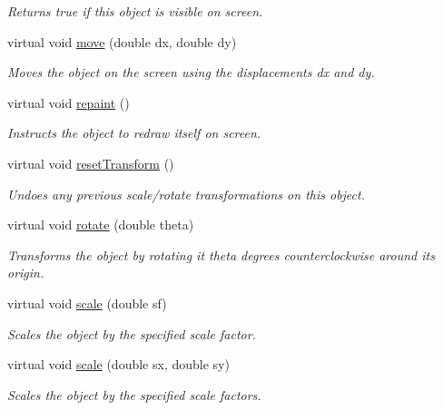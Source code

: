\begin{DoxyCompactItemize}
\begin{DoxyCompactList}\small\item\em Returns {\ttfamily true} if this object is visible on screen. \end{DoxyCompactList}\item 
virtual void \mbox{\hyperlink{classsgl_1_1GObject_a5973d8dda83afb36e2c56855515be392}{move}} (double dx, double dy)
\begin{DoxyCompactList}\small\item\em Moves the object on the screen using the displacements {\ttfamily dx} and {\ttfamily dy}. \end{DoxyCompactList}\item 
virtual void \mbox{\hyperlink{classsgl_1_1GObject_ac827b978aa122f136a14c198687ad80f}{repaint}} ()
\begin{DoxyCompactList}\small\item\em Instructs the object to redraw itself on screen. \end{DoxyCompactList}\item 
virtual void \mbox{\hyperlink{classsgl_1_1GObject_a6022a1fd1e5dcd2fd5585e5a36aa3f37}{reset\+Transform}} ()
\begin{DoxyCompactList}\small\item\em Undoes any previous scale/rotate transformations on this object. \end{DoxyCompactList}\item 
virtual void \mbox{\hyperlink{classsgl_1_1GObject_ae1ffaa12185dfd5ba464f7d87c329e26}{rotate}} (double theta)
\begin{DoxyCompactList}\small\item\em Transforms the object by rotating it {\ttfamily theta} degrees counterclockwise around its origin. \end{DoxyCompactList}\item 
virtual void \mbox{\hyperlink{classsgl_1_1GObject_ad2e1900f730475c2d044817db03b38d6}{scale}} (double sf)
\begin{DoxyCompactList}\small\item\em Scales the object by the specified scale factor. \end{DoxyCompactList}\item 
virtual void \mbox{\hyperlink{classsgl_1_1GObject_a63641f69d610d0b951357d35a0c3b1e3}{scale}} (double sx, double sy)
\begin{DoxyCompactList}\small\item\em Scales the object by the specified scale factors. \end{DoxyCompactList}\item 

\end{DoxyCompactItemize}
